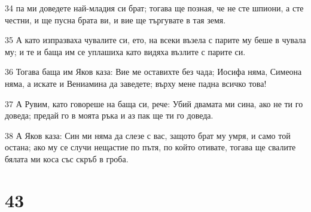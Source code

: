 \par 34 па ми доведете най-младия си брат; тогава ще позная, че не сте шпиони, а сте честни, и ще пусна брата ви, и вие ще търгувате в тая земя.
\par 35 А като изпразваха чувалите си, ето, на всеки възела с парите му беше в чувала му; и те и баща им се уплашиха като видяха възлите с парите си.
\par 36 Тогава баща им Яков каза: Вие ме оставихте без чада; Иосифа няма, Симеона няма, а искате и Вениамина да заведете; върху мене падна всичко това!
\par 37 А Рувим, като говореше на баща си, рече: Убий двамата ми сина, ако не ти го доведа; предай го в моята ръка и аз пак ще ти го доведа.
\par 38 А Яков каза: Син ми няма да слезе с вас, защото брат му умря, и само той остана; ако му се случи нещастие по пътя, по който отивате, тогава ще свалите бялата ми коса със скръб в гроба.

\chapter{43}

